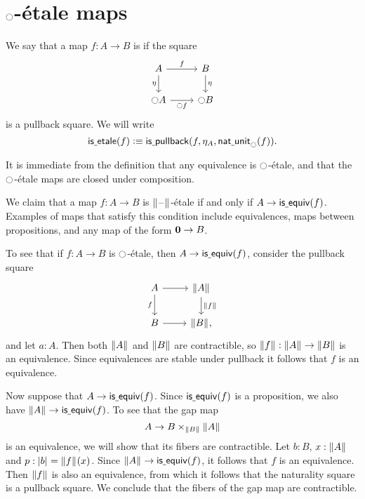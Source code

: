 \documentclass[9pt,twosided]{amsart}
\begin{document}
\section{${\ocircle}$-\'etale maps}

\begin{defn}
We say that a map $f:A\to B$ is  if the square
\begin{equation*}
\begin{tikzcd}
A \arrow[r,"f"] \arrow[d,swap,"\eta"] & B \arrow[d,"\eta"] \\
\modal A \arrow[r,swap,"\modal f"] & \modal B
\end{tikzcd}
\end{equation*}
is a pullback square. We will write
\begin{equation*}
\mathsf{is\underline{\ }{}etale}(f)\vcentcolon\equiv\mathsf{is\underline{\ }{}pullback}(f,\eta_A,\mathsf{nat\underline{\ }{}unit}_{\ocircle}(f)).
\end{equation*}
\end{defn}

It is immediate from the definition that any equivalence is ${\ocircle}$-\'etale, and that the ${\ocircle}$-\'etale maps are closed under composition.

\begin{eg}\label{eg:etale_prop}
We claim that a map $f:A\to B$ is $\brck{\blank}$-\'etale if and only if $A\to \mathsf{is\underline{\ }{}equiv}(f)$. Examples of maps that satisfy this condition include equivalences, maps between propositions, and any map of the form $\mathbf{0}\to B$.

To see that if $f:A\to B$ is ${\ocircle}$-\'etale, then $A\to\mathsf{is\underline{\ }{}equiv}(f)$, consider the pullback square
\begin{equation*}
\begin{tikzcd}
A \arrow[r] \arrow[d,swap,"f"] & \brck{A} \arrow[d,"\brck{f}"] \\
B \arrow[r] & \brck{B},
\end{tikzcd}
\end{equation*}
and let $a:A$. Then both $\brck{A}$ and $\brck{B}$ are contractible, so $\brck{f}:\brck{A}\to\brck{B}$ is an equivalence. Since equivalences are stable under pullback it follows that $f$ is an equivalence.

Now suppose that $A\to \mathsf{is\underline{\ }{}equiv}(f)$. Since $\mathsf{is\underline{\ }{}equiv}(f)$ is a proposition, we also have $\brck{A}\to\isequiv(f)$. To see that the gap map
\begin{equation*}
A \to B\times_{\brck{B}}\brck{A}
\end{equation*}
is an equivalence, we will show that its fibers are contractible. Let $b:B$, $x:\brck{A}$ and $p:\bproj{b}=\brck{f}(x)$. Since $\brck{A}\to\isequiv(f)$, it follows that $f$ is an equivalence. Then $\brck{f}$ is also an equivalence, from which it follows that the naturality square is a pullback square. We conclude that the fibers of the gap map are contractible. 
\end{eg}
\end{document}
